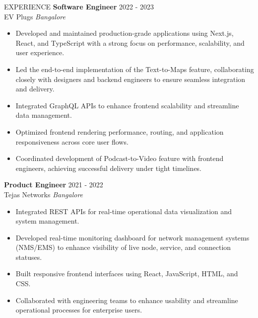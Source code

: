 \documentclass{resume} %
\begin{document}
\begin{rSection}{EXPERIENCE}
\textbf{Software Engineer} \hfill 2022 - 2023\\
EV Plugs \hfill \textit{Bangalore}
 \begin{itemize}
    \item Developed and maintained production-grade applications using Next.js, React, and TypeScript with a strong focus on performance, scalability, and user experience.
    \item Led the end-to-end implementation of the Text-to-Maps feature, collaborating closely with designers and backend engineers to ensure seamless integration and delivery.
    \item Integrated GraphQL APIs to enhance frontend scalability and streamline data management.
    \item Optimized frontend rendering performance, routing, and application responsiveness across core user flows.
    \item Coordinated development of Podcast-to-Video feature with frontend engineers, achieving successful delivery under tight timelines.
 \end{itemize}


\textbf{Product Engineer} \hfill 2021 - 2022\\
Tejas Networks \hfill \textit{Bangalore}
 \begin{itemize}
    \item Integrated REST APIs for real-time operational data visualization and system management.
    \item Developed real-time monitoring dashboard for network management systems (NMS/EMS) to enhance visibility of live node, service, and connection statuses.
    \item Built responsive frontend interfaces using React, JavaScript, HTML, and CSS.
    \item Collaborated with engineering teams to enhance usability and streamline operational processes for enterprise users.
 \end{itemize}

\end{rSection} 

\end{document}
